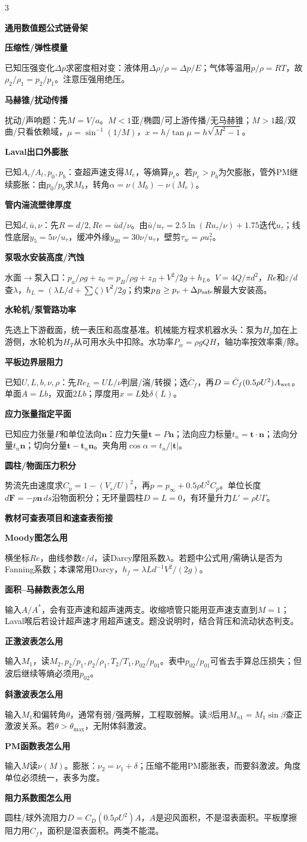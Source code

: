 \documentclass[a4paper]{article}
\newcommand{\qt}[1]{\vspace{0.25pt}\colorbox{Q}{\parbox{\dimexpr\linewidth-2\fboxsep}{\color{white}\bfseries #1}}\par}
\newcommand{\sect}[1]{\qt{#1}}
\begin{document}
\begin{multicols}{3}
{\sect{通用数值题公式链骨架}
\sect{压缩性/弹性模量}
已知压强变化$\Delta p$求密度相对变：液体用$\Delta\rho/\rho=\Delta p/E$；气体等温用$p/\rho=RT$，故$\rho_2/\rho_1=p_2/p_1$。注意压强用绝压。
\sect{马赫锥/扰动传播}
扰动/声响题：先$M=V/a$。$M<1$亚/椭圆/可上游传播/无马赫锥；$M>1$超/双曲/只看依赖域，$\mu=\sin^{-1}(1/M)$，$x=h/\tan\mu=h\sqrt{M^2-1}$。
\sect{Laval出口外膨胀}
已知$A_e/A_t,p_0,p_b$：查超声速支得$M_e$，等熵算$p_e$。若$p_e>p_b$为欠膨胀，管外PM继续膨胀：由$p_0/p_b$求$M_b$，转角$\alpha=\nu(M_b)-\nu(M_e)$。
\sect{管内湍流壁律厚度}
已知$d,\bar u,\nu$：先$R=d/2,Re=\bar ud/\nu$。由$\bar u/u_\tau=2.5\ln(Ru_\tau/\nu)+1.75$迭代$u_\tau$；线性底层$y_5=5\nu/u_\tau$，缓冲外缘$y_{30}=30\nu/u_\tau$，壁剪$\tau_w=\rho u_\tau^2$。
\sect{泵吸水安装高度/汽蚀}
水面$\to$泵入口：$p_a/\rho g+z_0=p_B/\rho g+z_B+V^2/2g+h_L$。$V=4Q/\pi d^2$，$Re$和$\varepsilon/d$查$\lambda$，$h_L=(\lambda L/d+\sum\zeta)V^2/2g$；约束$p_B\ge p_v+\Delta p_{\rm safe}$解最大安装高。
\sect{水轮机/泵管路功率}
先选上下游截面，统一表压和高度基准。机械能方程求机器水头：泵为$H_p$加在上游侧，水轮机为$H_T$从可用水头中扣除。水功率$P_w=\rho gQH$，轴功率按效率乘/除。
\sect{平板边界层阻力}
已知$U,L,b,\nu,\rho$：先$Re_L=UL/\nu$判层/湍/转捩；选$\bar C_f$，再$D=\bar C_f(0.5\rho U^2)A_{\rm wet}$。单面$A=Lb$，双面$2Lb$；厚度用$x=L$处$\delta(L)$。
\sect{应力张量指定平面}
已知应力张量$P$和单位法向$\bm n$：应力矢量$\bm t=P\bm n$；法向应力标量$t_n=\bm t\cdot\bm n$；法向分量$t_n\bm n$；切向分量$\bm t-\bm t_n\bm n$。夹角用$\cos\alpha=t_n/|\bm t|$。
\sect{圆柱/物面压力积分}
势流先由速度求$C_p=1-(V_s/U)^2$，再$p=p_\infty+0.5\rho U^2 C_p$。单位长度$d\bm F=-p\bm n\,ds$沿物面积分；无环量圆柱$D=L=0$，有环量升力$L'=\rho U\Gamma$。

\sect{教材可查表项目和速查表衔接}
\sect{Moody图怎么用}
横坐标$Re$，曲线参数$\varepsilon/d$，读Darcy摩阻系数$\lambda$。若题中公式用$f$需确认是否为Fanning系数；本课常用Darcy，$h_f=\lambda Ld^{-1}V^2/(2g)$。
\sect{面积--马赫数表怎么用}
输入$A/A^*$，会有亚声速和超声速两支。收缩喷管只能用亚声速支直到$M=1$；Laval喉后若设计超声速才用超声速支。题没说明时，结合背压和流动状态判支。
\sect{正激波表怎么用}
输入$M_1$，读$M_2,p_2/p_1,\rho_2/\rho_1,T_2/T_1,p_{02}/p_{01}$。表中$p_{02}/p_{01}$可省去手算总压损失；但波后继续等熵必须用$p_{02}$。
\sect{斜激波表怎么用}
输入$M_1$和偏转角$\theta$，通常有弱/强两解，工程取弱解。读$\beta$后用$M_{n1}=M_1\sin\beta$查正激波关系。若$\theta>\theta_{\max}$，无附体斜激波。
\sect{PM函数表怎么用}
输入$M$读$\nu(M)$。膨胀：$\nu_2=\nu_1+\delta$；压缩不能用PM膨胀表，而要斜激波。角度单位必须统一，表多为度。
\sect{阻力系数图怎么用}
圆柱/球外流阻力$D=C_D(0.5\rho U^2)A$，$A$是迎风面积，不是湿表面积。平板摩擦阻力用$C_f$，面积是湿表面积。两类不能混。

}
\end{multicols}
\end{document}

